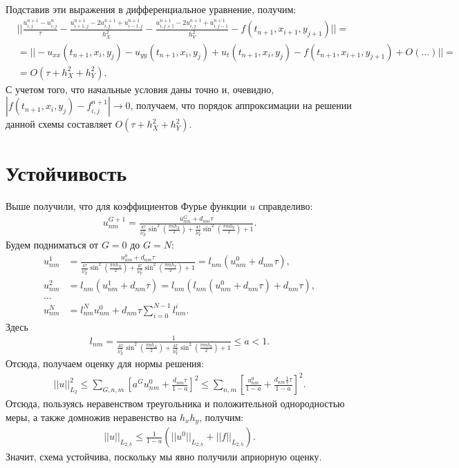 \documentclass[14pt,a4paper]{extarticle}
\newcommand{\1}{\mathbbm{1}}
\begin{document}
Подставив эти выражения в дифференциальное уравнение, получим:
\begin{align*}
    &||\frac{u_{i, j}^{n+1} - u_{i, j}^n}{\tau} - \frac{u_{i+1, j}^{n+1} - 2 u_{i, j}^{n+1} + u_{i-1, j}^{n+1}}{h_X^2} - 
    \frac{u_{i, j+1}^{n+1} - 2 u_{i, j}^{n+1} + u_{i, j-1}^{n+1}}{h_Y^2}
     - f(t_{n+1}, x_{i+1}, y_{j+1})|| = \\
    &= ||- u_{xx}(t_{n+1}, x_{i}, y_j) - u_{yy}(t_{n+1}, x_{i}, y_j) + 
    u_t(t_{n+1}, x_i, y_j) - f(t_{n+1}, x_{i+1}, y_{j+1}) + O(\ldots)||=\\ 
    &=
     O(\tau + h_X^2 + h_Y^2).
\end{align*}
С учетом того, что начальные условия даны точно и, очевидно, 
$|f(t_{n+1}, x_i, y_j) - f_{i,j}^{n+1}| \rightarrow 0$, получаем, что порядок аппроксимации на решении 
данной схемы составляет $O(\tau + h_X^2 + h_Y^2)$.

\section{Устойчивость}
Выше получили, что для коэффициентов Фурье функции $u$ справделиво:
\begin{align*}
    u_{nm}^{G+1} = \frac{u_{nm}^G + d_{nm} \tau}{\frac{4 \tau}{h_X^2} \sin ^2\left(\frac{\pi n h_X}{2}\right)
    +  \frac{4 \tau}{h_Y^2} \sin ^2\left(\frac{\pi m h_Y}{2}\right) + 1}.
\end{align*}
Будем подниматься от $G=0$ до $G=N$:
\begin{align*}
    u_{nm}^{1} &= \frac{u_{nm}^0 + d_{nm} \tau}{\frac{4 \tau}{h_X^2} \sin ^2\left(\frac{\pi n h_X}{2}\right)
    +  \frac{4 \tau}{h_Y^2} \sin ^2\left(\frac{\pi m h_Y}{2}\right) + 1} = l_{nm} (u_{nm}^0 + d_{nm} \tau), \\
    u_{nm}^{2} &= l_{nm} (u_{nm}^1 + d_{nm} \tau) = l_{nm} (l_{nm} (u_{nm}^0 + d_{nm} \tau)+ d_{nm} \tau), \\
    \ldots \\
    u_{nm}^{N} &=l_{nm}^N u_{nm}^0 + d_{nm} \tau \sum _{i=0}^{N-1} l_{nm}^i. 
\end{align*}
Здесь 
\begin{align*}
    l_{nm} = \frac{1}{\frac{4 \tau}{h_X^2} \sin ^2\left(\frac{\pi n h_X}{2}\right)
    +  \frac{4 \tau}{h_Y^2} \sin ^2\left(\frac{\pi m h_Y}{2}\right) + 1} \leq a < 1.
\end{align*}
Отсюда, получаем оценку для нормы решения:
\begin{align*}
    ||u||_{L_{2}}^2\leq \sum_{G, n, m} \left[a^G u_{nm}^0 + \frac{d_{nm} \tau}{1-a}\right]^2  
    \leq \sum_{n, m} \left[\frac{u^0_{nm}}{1 - a} + \frac{d_{nm} \frac{1}{\tau}  \tau}{1-a}\right]^2 .
\end{align*}
Отсюда, пользуясь неравенством треугольника и положительной однородностью меры, а также домножив неравенство на $h_x h_y$, получим:
\begin{align*}
    ||u||_{L_{2, h}}\leq \frac{1}{1-a}\left( ||u^0||_{L_{2, h}} + ||f||_{L_{2, h}}\right) .
\end{align*}
Значит, схема устойчива, поскольку мы явно получили априорную оценку. 
\end{document}

